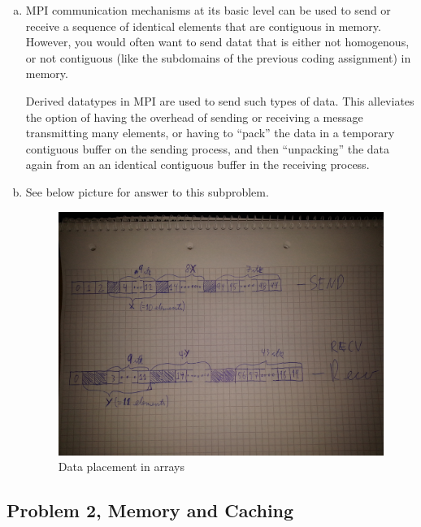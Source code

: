 \documentclass[fontsize=11pt, paper=a4, titlepage]{article}
\begin{document}
\begin{enumerate}[a)]

    \item MPI communication mechanisms at its basic level can be used to send or
receive a sequence of identical elements that are contiguous in memory. However,
you would often want to send datat that is either not homogenous, or not
contiguous (like the subdomains of the previous coding assignment) in memory.

Derived datatypes in MPI are used to send such types of data. This alleviates
the option of having the overhead of sending or receiving a message transmitting
many elements, or having to ``pack'' the data in a temporary contiguous buffer
on the sending process, and then ``unpacking'' the data again from an an
identical contiguous buffer in the receiving process.

    \item See below picture for answer to this subproblem.
        \begin{figure}[H]
            \centering
            \includegraphics[width=1.0\linewidth]{1b.jpg}
            \caption{Data placement in arrays}
            \label{fig:1b}
        \end{figure}

\end{enumerate}

\subsection{Problem 2, Memory and Caching}
\end{document}
